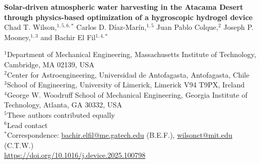 \documentclass[11pt]{article}
\begin{document}
\begin{center}
{\Large\bfseries Solar-driven atmospheric water harvesting in the Atacama Desert through physics-based optimization of a hygroscopic hydrogel device}\\[1.2em]

Chad T. Wilson,$^{1,5,6,*}$ Carlos D. Díaz-Marín,$^{1,5}$ Juan Pablo Colque,$^{2}$ Joseph P. Mooney,$^{1,3}$ and Bachir El Fil$^{1,4,*}$
\end{center}

\noindent
$^{1}$Department of Mechanical Engineering, Massachusetts Institute of Technology, Cambridge, MA 02139, USA\\
$^{2}$Center for Astroengineering, Universidad de Antofagasta, Antofagasta, Chile\\
$^{3}$School of Engineering, University of Limerick, Limerick V94 T9PX, Ireland\\
$^{4}$George W. Woodruff School of Mechanical Engineering, Georgia Institute of Technology, Atlanta, GA 30332, USA\\
$^{5}$These authors contributed equally\\
$^{6}$Lead contact\\
$^{*}$Correspondence: \href{mailto:bachir.elfil@me.gatech.edu}{bachir.elfil@me.gatech.edu} (B.E.F.), \href{mailto:wilsonct@mit.edu}{wilsonct@mit.edu} (C.T.W.)\\
\url{https://doi.org/10.1016/j.device.2025.100798}

\vspace{1em}
\end{document}
